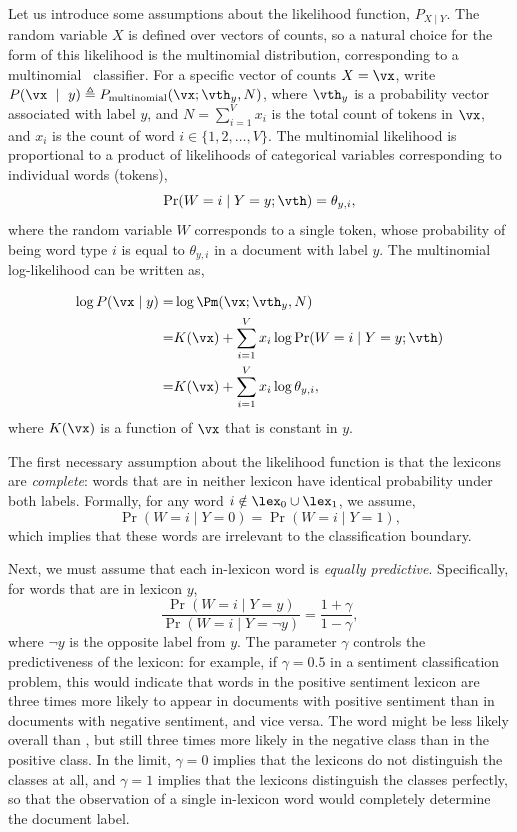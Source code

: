 Let us introduce some assumptions about the likelihood function, $P_{X \mid Y}$. The random variable $X$ is defined over vectors of counts, so a natural choice for the form of this likelihood is the multinomial distribution, corresponding to a multinomial \nb\ classifier. For a specific vector of counts $X = \vx$, write $P(\vx~\mid~y) \triangleq P_{\text{multinomial}}(\vx ; \vth_y, N)$, where $\vth_y$ is a probability vector associated with label $y$, and $N = \sum^V_{i=1} x_i$ is the total count of tokens in $\vx$, and $x_i$ is the count of word $i \in \{1, 2, \ldots, V\}$. The multinomial likelihood is proportional to a product of likelihoods of categorical variables corresponding to individual words (tokens), 
\begin{equation}
\Pr(W=i \mid Y=y; \vth) = \theta_{y,i},
\end{equation}
where the random variable $W$ corresponds to a single token, whose probability of being word type $i$ is equal to $\theta_{y,i}$ in a document with label $y$. The multinomial log-likelihood can be written as,

\begin{align}
\notag
\log P(\vx \mid y) = & \log \Pm(\vx; \vth_y, N)\\
\notag
= & K(\vx) + \sum^V_{i=1} x_i \log \Pr(W= i \mid Y = y; \vth)\\
= & K(\vx) + \sum^V_{i=1} x_i \log \theta_{y,i},
\end{align}
where $K(\vx)$ is a function of $\vx$ that is constant in $y$. 

The first necessary assumption about the likelihood function is that the lexicons are \emph{complete}: words that are in neither lexicon have identical probability under both labels. Formally, for any word $i \notin \lex_0 \cup \lex_1$, we assume,
\begin{equation}
\Pr(W = i \mid Y=0) = \Pr(W = i \mid Y=1),
\label{eq:assume-complete}
\end{equation}
which implies that these words are irrelevant to the classification boundary.

Next, we must assume that each in-lexicon word is \emph{equally predictive}. Specifically, for words that are in lexicon $y$,
\begin{equation}
\frac{\Pr(W = i \mid Y = y)}{\Pr(W = i \mid Y = \neg y)} = \frac{1+\gamma}{1-\gamma},
\label{eq:assume-equal}
\end{equation}
where $\neg y$ is the opposite label from $y$. The parameter $\gamma$ controls the predictiveness of the lexicon: for example, if $\gamma =0.5$ in a sentiment classification problem, this would indicate that words in the positive sentiment lexicon are three times more likely to appear in documents with positive sentiment than in documents with negative sentiment, and vice versa. The word  might be less likely overall than , but still three times more likely in the negative class than in the positive class. In the limit, $\gamma=0$ implies that the lexicons do not distinguish the classes at all, and $\gamma=1$ implies that the lexicons distinguish the classes perfectly, so that the observation of a single in-lexicon word would completely determine the document label.

